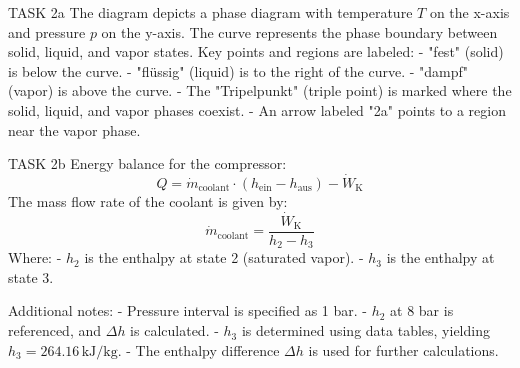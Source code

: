 TASK 2a  
The diagram depicts a phase diagram with temperature \( T \) on the x-axis and pressure \( p \) on the y-axis. The curve represents the phase boundary between solid, liquid, and vapor states. Key points and regions are labeled:  
- "fest" (solid) is below the curve.  
- "flüssig" (liquid) is to the right of the curve.  
- "dampf" (vapor) is above the curve.  
- The "Tripelpunkt" (triple point) is marked where the solid, liquid, and vapor phases coexist.  
- An arrow labeled "2a" points to a region near the vapor phase.  

TASK 2b  
Energy balance for the compressor:  
\[
Q = \dot{m}_{\text{coolant}} \cdot (h_{\text{ein}} - h_{\text{aus}}) - \dot{W}_{\text{K}}
\]  
The mass flow rate of the coolant is given by:  
\[
\dot{m}_{\text{coolant}} = \frac{\dot{W}_{\text{K}}}{h_2 - h_3}
\]  
Where:  
- \( h_2 \) is the enthalpy at state 2 (saturated vapor).  
- \( h_3 \) is the enthalpy at state 3.  

Additional notes:  
- Pressure interval is specified as 1 bar.  
- \( h_2 \) at 8 bar is referenced, and \( \Delta h \) is calculated.  
- \( h_3 \) is determined using data tables, yielding \( h_3 = 264.16 \, \text{kJ/kg} \).  
- The enthalpy difference \( \Delta h \) is used for further calculations.